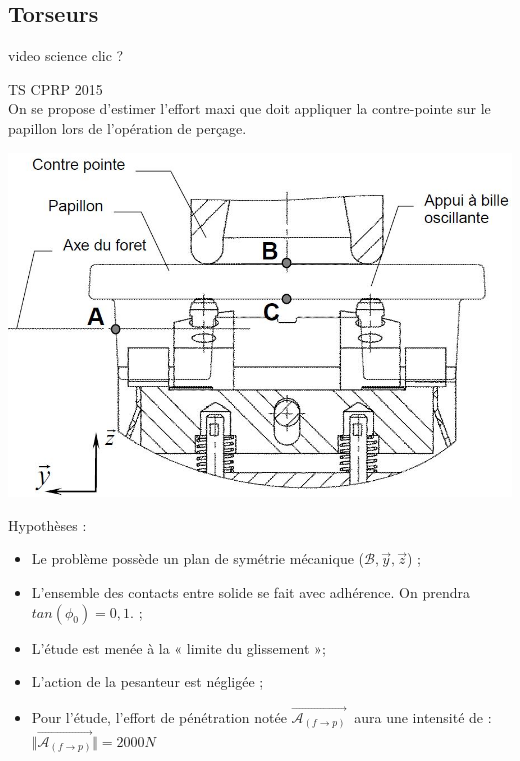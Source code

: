 \documentclass[
	11pt, %
	fleqn, %
	a4paper, %
]{LegrandOrangeBook}
\begin{document}
\subsection{Torseurs}
video science clic ?

\begin{Extrait}
TS CPRP 2015 \\
On se propose d’estimer l’effort maxi que doit appliquer la contre-pointe sur le papillon lors de l’opération de perçage. \\



\noindent \begin{minipage}{0.5\textwidth}
\vspace{1cm}
\includegraphics[width=1\textwidth]{Images/2015.JPG}
\label{fig:nature}
\end{minipage}
\hspace{0.05\textwidth}
\begin{minipage}{0.4\textwidth}
Hypothèses : 
\begin{itemize}
\item Le problème possède un plan de
symétrie mécanique ($\mathcal{B}, \Vec{y}, \Vec{z}$) ;
\item L’ensemble des contacts entre
solide se fait avec adhérence. On
prendra $tan(\phi_{0}) = 0,1.$ ;
\item L’étude est menée à la « limite du
glissement »;
\item L'action de la pesanteur est
négligée ;
\item Pour l’étude, l’effort de pénétration notée $\overrightarrow{\mathcal{A}_{(f\rightarrow p)}}\ $ aura une intensité de : \\ $ \Vert \overrightarrow{\mathcal{A}_{(f\rightarrow p)}} \Vert = 2000 N\ $
\end{itemize}


\end{minipage}
\end{Extrait}
\end{document}

